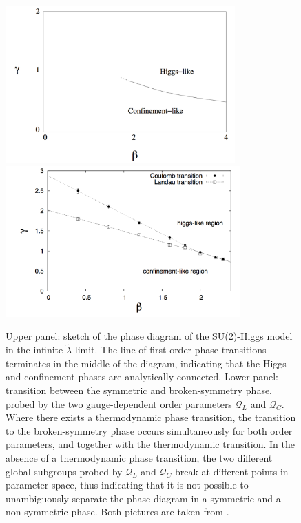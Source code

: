 \begin{figure}[thb] 
\begin{center}
  \includegraphics[width=8.8cm,clip]{pics/SU2H_phase_diagram}
  \includegraphics[width=9cm,clip]{pics/SU2H_phase_diagram_GF}
\end{center}
  \caption{Upper panel: sketch of the phase diagram of the SU(2)-Higgs model in the infinite-$\tilde\lambda$ limit. The line of first order phase transitions terminates in the middle of the diagram, indicating that the Higgs and confinement phases are analytically connected. Lower panel: transition between the symmetric and broken-symmetry phase, probed by the two gauge-dependent order parameters $\mathcal Q_L$ and $\mathcal Q_C$. Where there exists a thermodynamic phase transition, the transition to the broken-symmetry phase occurs simultaneously for both order parameters, and together with the thermodynamic transition. In the absence of a thermodynamic phase transition, the two different global subgroups probed by $\mathcal Q_L$ and $\mathcal Q_C$ break at different points in parameter space, thus indicating that it is not possible to unambiguously separate the phase diagram in a symmetric and a non-symmetric phase. Both pictures are taken from \cite{Caudy:2007sf}.}
  \label{SU2H_phase_diagram}
\end{figure}

